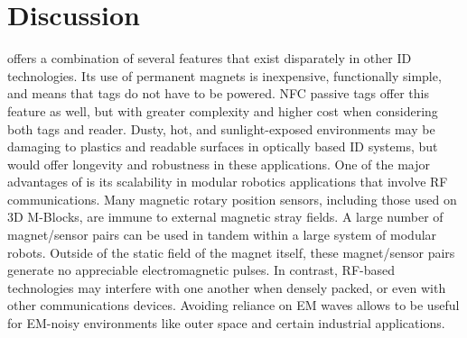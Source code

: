 \section{Discussion}
\label{sec:Discussion}

\tagName offers a combination of several features that exist disparately in other ID technologies. Its use of permanent magnets is inexpensive, functionally simple, and means that tags do not have to be powered. NFC passive tags offer this feature as well, but with greater complexity and higher cost when considering both tags and reader. Dusty, hot, and sunlight-exposed environments may be damaging to plastics and readable surfaces in optically based ID systems, but \tagName would offer longevity and robustness in these applications. One of the major advantages of \tagName is its scalability in modular robotics applications that involve RF communications. Many magnetic rotary position sensors, including those used on 3D M-Blocks, are immune to external magnetic stray fields. A large number of magnet/sensor pairs can be used in tandem within a large system of modular robots. Outside of the static field of the magnet itself, these magnet/sensor pairs generate no appreciable electromagnetic pulses. In contrast, RF-based technologies may interfere with one another when densely packed, or even with other communications devices. Avoiding reliance on EM waves allows \tagName to be useful for EM-noisy environments like outer space and certain industrial applications.

